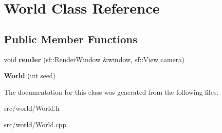 \hypertarget{classWorld}{\section{World Class Reference}
\label{classWorld}
}
\subsection*{Public Member Functions}
\begin{DoxyCompactItemize}
\item 
\hypertarget{classWorld_ad41d823a21794ad47ac4478677b0ae7f}{void {\bfseries render} (sf\-::\-Render\-Window \&window, sf\-::\-View camera)}\label{classWorld_ad41d823a21794ad47ac4478677b0ae7f}

\item 
\hypertarget{classWorld_a4598832293e050abba792d1b4367a368}{{\bfseries World} (int seed)}\label{classWorld_a4598832293e050abba792d1b4367a368}

\end{DoxyCompactItemize}


The documentation for this class was generated from the following files\-:\begin{DoxyCompactItemize}
\item 
src/world/World.\-h\item 
src/world/World.\-cpp\end{DoxyCompactItemize}
